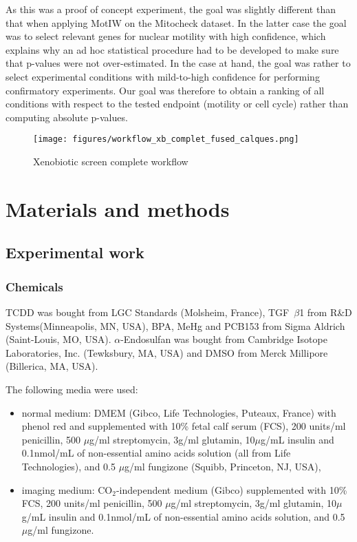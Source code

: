 As this was a proof of concept experiment, the goal was slightly different than that when applying MotIW on the Mitocheck dataset. In the latter case the goal was to select relevant genes for nuclear motility with high confidence, which explains why an ad hoc statistical procedure had to be developed to make sure that p-values were not over-estimated. In the case at hand, the goal was rather to select experimental conditions with mild-to-high confidence for performing confirmatory experiments. Our goal was therefore to obtain a ranking of all conditions with respect to the tested endpoint (motility or cell cycle) rather than computing absolute p-values.

\begin{figure}[!ht]
\centering
\texttt{[image: figures/workflow\_xb\_complet\_fused\_calques.png]}
\caption{Xenobiotic screen complete workflow}
\label{xbsc_workflow}
\end{figure}

\section{Materials and methods}
\label{protocoles}
\subsection{Experimental work}
\subsubsection{Chemicals}
TCDD was bought from LGC Standards (Molsheim, France), TGF~$\beta$1 from R\&D Systems\texttrademark (Minneapolis, MN, USA), BPA, MeHg and PCB153 from Sigma Aldrich\up{\textregistered} (Saint-Louis, MO, USA). $\alpha$-Endosulfan was bought from Cambridge Isotope Laboratories, Inc. (Tewksbury, MA, USA) and DMSO from Merck Millipore (Billerica, MA, USA).

The following media were used:
\begin{itemize}
\item normal medium: DMEM (Gibco\up{\textregistered}, Life Technologies\texttrademark, Puteaux, France) with phenol red and supplemented with 10\% fetal calf serum (FCS), 200 units/ml penicillin, 500 $\mu$g/ml streptomycin, 3g/ml glutamin, 10$\mu$g/mL insulin and 0.1nmol/mL %
of non-essential amino acids solution (all from Life Technologies\texttrademark), and 0.5 $\mu$g/ml fungizone (Squibb, Princeton, NJ, USA),
\item imaging medium: CO$_2$-independent medium (Gibco\up{\textregistered}) supplemented with 10\% FCS, 200 units/ml penicillin, 500 $\mu$g/ml streptomycin, 3g/ml glutamin, 10$\mu$g/mL insulin and 0.1nmol/mL %
of non-essential amino acids solution, and 0.5 $\mu$g/ml fungizone.
\end{itemize}

